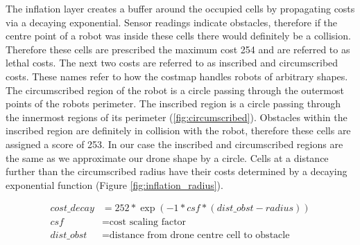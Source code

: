 \documentclass[capstone_report.tex]{subfiles}
\begin{document}
The inflation layer creates a buffer around the occupied cells by propagating costs via a decaying exponential.  Sensor readings indicate obstacles, therefore if the centre point of a robot was inside these cells there would definitely be a collision.  Therefore these cells are prescribed the maximum cost 254 and are referred to as lethal costs.  The next two costs are referred to as inscribed and circumscribed costs.  These names refer to how the costmap handles robots of arbitrary shapes.  The circumscribed region of the robot is a circle passing through the outermost points of the robots perimeter.  The inscribed region is a circle passing through the innermost regions of its perimeter (\ref{fig:circumscribed}).  Obstacles within the inscribed region are definitely in collision with the robot, therefore these cells are assigned a score of 253.  In our case the inscribed and circumscribed regions are the same as we approximate our drone shape by a circle.  Cells at a distance further than the circumscribed radius have their costs determined by a decaying exponential function (Figure \ref{fig:inflation_radius}).

\begin{align*}
    cost\_decay &= 252*\exp(-1 * csf * (dist\_obst - radius))\\
    csf &=    \text{cost scaling factor}\\
    dist\_obst &=    \text{distance from drone centre cell to obstacle}
\end{align*}
\end{document}
